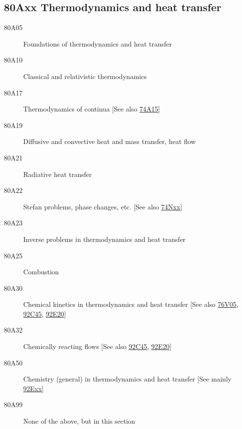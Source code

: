 \subsection*{80Axx  Thermodynamics and heat transfer }\label{80Axx}
\begin{description}  
\item [80A05]\label{80A05} Foundations of thermodynamics and heat transfer
\item [80A10]\label{80A10} Classical and relativistic thermodynamics
\item [80A17]\label{80A17} Thermodynamics of continua [See also \hyperref[74A15]{74A15}]
\item [80A19]\label{80A19} Diffusive and convective heat and mass transfer, heat flow
\item [80A21]\label{80A21} Radiative heat transfer
\item [80A22]\label{80A22} Stefan problems, phase changes, etc. [See also \hyperref[74Nxx]{74Nxx}]
\item [80A23]\label{80A23} Inverse problems in thermodynamics and heat transfer
\item [80A25]\label{80A25} Combustion
\item [80A30]\label{80A30} Chemical kinetics in thermodynamics and heat transfer [See also \hyperref[76V05]{76V05}, \hyperref[92C45]{92C45}, \hyperref[92E20]{92E20}]
\item [80A32]\label{80A32} Chemically reacting flows [See also \hyperref[92C45]{92C45}, \hyperref[92E20]{92E20}]
\item [80A50]\label{80A50} Chemistry (general) in thermodynamics and heat transfer [See mainly \hyperref[92Exx]{92Exx}]
\item [80A99]\label{80A99} None of the above, but in this section
\end{description}
